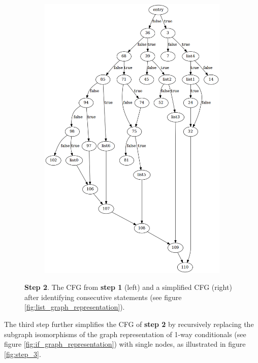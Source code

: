 \begin{figure}[htbp]
\begin{subfigure}[t]{0.45\textwidth}
		\includegraphics[width=\textwidth]{appendices/stmt_example/stmt_2.png}
	\end{subfigure}
	\caption{\textbf{Step 2}. The CFG from \textbf{step 1} (left) and a simplified CFG (right) after identifying consecutive statements (see figure \ref{fig:list_graph_representation}).}
	\label{fig:step_2}
\end{figure}

The third step further simplifies the CFG of \textbf{step 2} by recursively replacing the subgraph isomorphisms of the graph representation of 1-way conditionals (see figure \ref{fig:if_graph_representation}) with single nodes, as illustrated in figure \ref{fig:step_3}.


